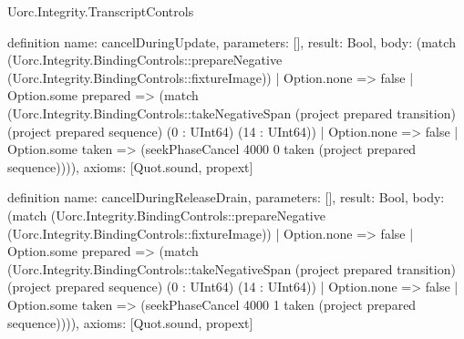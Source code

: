 \begin{lexlean}{Uorc.Integrity.TranscriptControls}
\begin{semanticmodule}
definition{
  name: cancelDuringUpdate,
  parameters: [],
  result: Bool,
  body: (match (Uorc.Integrity.BindingControls::prepareNegative (Uorc.Integrity.BindingControls::fixtureImage))
    | Option.none => false
    | Option.some prepared => (match (Uorc.Integrity.BindingControls::takeNegativeSpan (project prepared transition) (project prepared sequence) (0 : UInt64) (14 : UInt64))
      | Option.none => false
      | Option.some taken => (seekPhaseCancel 4000 0 taken (project prepared sequence)))),
  axioms: [Quot.sound, propext]
}

definition{
  name: cancelDuringReleaseDrain,
  parameters: [],
  result: Bool,
  body: (match (Uorc.Integrity.BindingControls::prepareNegative (Uorc.Integrity.BindingControls::fixtureImage))
    | Option.none => false
    | Option.some prepared => (match (Uorc.Integrity.BindingControls::takeNegativeSpan (project prepared transition) (project prepared sequence) (0 : UInt64) (14 : UInt64))
      | Option.none => false
      | Option.some taken => (seekPhaseCancel 4000 1 taken (project prepared sequence)))),
  axioms: [Quot.sound, propext]
}


\end{semanticmodule}
\end{lexlean}
